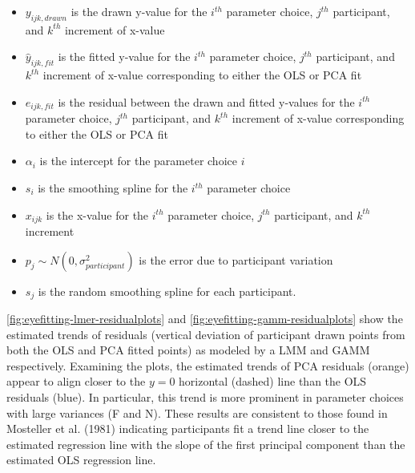 \documentclass[print]{nuthesis}
\providecommand{\tightlist}{%
  \setlength{\itemsep}{0pt}\setlength{\parskip}{0pt}}
\begin{document}
\begin{itemize}
\tightlist
\item
  \(y_{ijk,drawn}\) is the drawn y-value for the \(i^{th}\) parameter choice, \(j^{th}\) participant, and \(k^{th}\) increment of x-value
\item
  \(\hat y_{ijk,fit}\) is the fitted y-value for the \(i^{th}\) parameter choice, \(j^{th}\) participant, and \(k^{th}\) increment of x-value corresponding to either the OLS or PCA fit
\item
  \(e_{ijk,fit}\) is the residual between the drawn and fitted y-values for the \(i^{th}\) parameter choice, \(j^{th}\) participant, and \(k^{th}\) increment of x-value corresponding to either the OLS or PCA fit
\item
  \(\alpha_i\) is the intercept for the parameter choice \(i\)
\item
  \(s_{i}\) is the smoothing spline for the \(i^{th}\) parameter choice
\item
  \(x_{ijk}\) is the x-value for the \(i^{th}\) parameter choice, \(j^{th}\) participant, and \(k^{th}\) increment
\item
  \(p_{j} \sim N(0, \sigma^2_{participant})\) is the error due to participant variation
\item
  \(s_{j}\) is the random smoothing spline for each participant.
\end{itemize}

\cref{fig:eyefitting-lmer-residualplots} and \cref{fig:eyefitting-gamm-residualplots} show the estimated trends of residuals (vertical deviation of participant drawn points from both the OLS and PCA fitted points) as modeled by a LMM and GAMM respectively.
Examining the plots, the estimated trends of PCA residuals (orange) appear to align closer to the \(y=0\) horizontal (dashed) line than the OLS residuals (blue).
In particular, this trend is more prominent in parameter choices with large variances (F and N).
These results are consistent to those found in Mosteller et al. (1981) indicating participants fit a trend line closer to the estimated regression line with the slope of the first principal component than the estimated OLS regression line.
\end{document}
